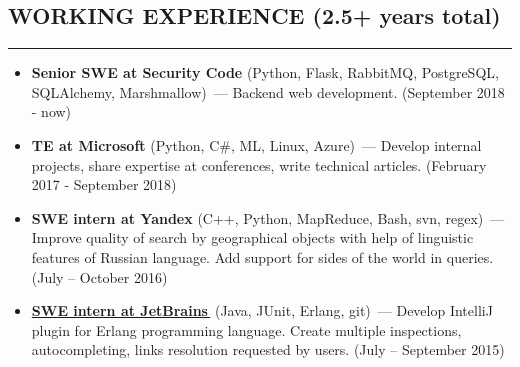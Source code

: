 \documentclass[11pt]{res} %
\let\orighref\href
\renewcommand{\href}[2]{\orighref{#1}{#2\,\faExternalLink}}
\begin{document}
\begin{resume}
\section{\uppercase{Working Experience} (2.5+ years total)}
\begin{spacing}{0.3}
\textcolor[RGB]{220,220,220}{\rule{\linewidth}{0.4pt}} 
\end{spacing}
\vspace{0.2in}
   \begin{itemize} \itemsep -2pt  %
   \item {\textbf{Senior SWE at Security Code}} (Python, Flask, RabbitMQ, PostgreSQL, SQLAlchemy, Marshmallow)~--- Backend web development. (September 2018 - now)
   \item {\textbf{TE at Microsoft}} (Python, C\#, ML, Linux, Azure)~--- Develop internal projects, share expertise at conferences, write technical articles. (February 2017 - September 2018)
   \item {\textbf{SWE intern at Yandex}} (C++, Python, MapReduce, Bash, svn, regex)~--- Improve quality of search by geographical objects with help of linguistic features of Russian language. Add support for sides of the world in queries. (July – October 2016)
   \item \textbf{\href{https://github.com/ignatov/intellij-erlang/commits?author=telezhnaya}{SWE intern at JetBrains}} (Java, JUnit, Erlang, git)~--- Develop IntelliJ plugin for Erlang programming language. Create multiple inspections, autocompleting, links resolution requested by users. (July – September 2015)
 \end{itemize}


\end{resume}
\end{document}
